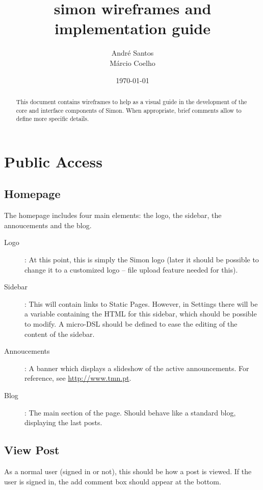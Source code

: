 \documentclass[english]{article}%
\begin{document}
\title{\textbf{simon} wireframes and implementation guide}
\author{\small{André Santos}\\\small{Márcio Coelho}}
\pagestyle{fancy}
\date{\today}
\maketitle
\begin{abstract}
This document contains wireframes to help as a visual guide in the development of the core and interface components of Simon. When appropriate, brief comments allow to define more specific details.
\end{abstract}
\tableofcontents

\section{Public Access}
\subsection{Homepage}
The homepage includes four main elements: the logo, the sidebar, the annoucements and the blog.
\begin{description}
\item[Logo]: At this point, this is simply the Simon logo (later it should be possible to change it to a customized logo -- file upload feature needed for this).
\item[Sidebar]: This will contain links to Static Pages. However, in Settings there will be a variable containing the HTML for this sidebar, which should be possible to modify. A micro-DSL should be defined to ease the editing of the content of the sidebar.
\item[Annoucements]: A banner which displays a slideshow of the active announcements. For reference, see \url{http://www.tmn.pt}.
\item[Blog]: The main section of the page. Should behave like a standard blog, displaying the last posts.
\end{description}

\subsection{View Post}
As a normal user (signed in or not), this should be how a post is viewed. If the user is signed in, the add comment box should appear at the bottom.
\end{document}
